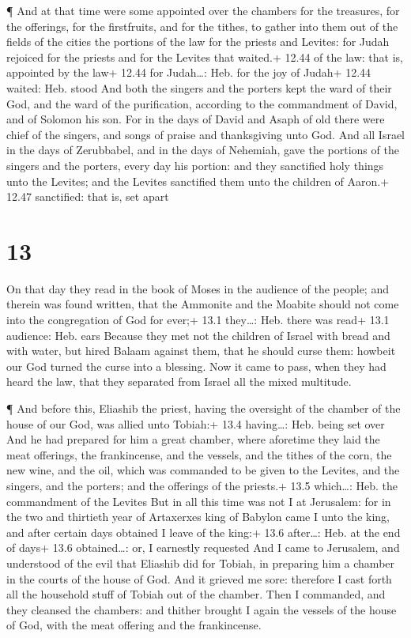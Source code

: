 ¶ And at that time were some appointed over the chambers
for the treasures, for the offerings, for the firstfruits, and for the
tithes, to gather into them out of the fields of the cities the portions
of the law for the priests and Levites: for Judah rejoiced for the
priests and for the Levites that waited.+ 12.44 of the law: that is,
appointed by the law+ 12.44 for Judah\ldots: Heb. for the joy of Judah+
12.44 waited: Heb. stood  And both the singers and the
porters kept the ward of their God, and the ward of the purification,
according to the commandment of David, and of Solomon his son.
 For in the days of David and Asaph of old there were chief
of the singers, and songs of praise and thanksgiving unto God.
 And all Israel in the days of Zerubbabel, and in the days
of Nehemiah, gave the portions of the singers and the porters, every day
his portion: and they sanctified holy things unto the Levites; and the
Levites sanctified them unto the children of Aaron.+ 12.47 sanctified:
that is, set apart

\hypertarget{section-12}{%
\section{13}\label{section-12}}

 On that day they read in the book of Moses in the audience
of the people; and therein was found written, that the Ammonite and the
Moabite should not come into the congregation of God for ever;+ 13.1
they\ldots: Heb. there was read+ 13.1 audience: Heb. ears 
Because they met not the children of Israel with bread and with water,
but hired Balaam against them, that he should curse them: howbeit our
God turned the curse into a blessing.  Now it came to pass,
when they had heard the law, that they separated from Israel all the
mixed multitude.

 ¶ And before this, Eliashib the priest, having the
oversight of the chamber of the house of our God, was allied unto
Tobiah:+ 13.4 having\ldots: Heb. being set over  And he had
prepared for him a great chamber, where aforetime they laid the meat
offerings, the frankincense, and the vessels, and the tithes of the
corn, the new wine, and the oil, which was commanded to be given to the
Levites, and the singers, and the porters; and the offerings of the
priests.+ 13.5 which\ldots: Heb. the commandment of the Levites
 But in all this time was not I at Jerusalem: for in the two
and thirtieth year of Artaxerxes king of Babylon came I unto the king,
and after certain days obtained I leave of the king:+ 13.6 after\ldots:
Heb. at the end of days+ 13.6 obtained\ldots: or, I earnestly requested
 And I came to Jerusalem, and understood of the evil that
Eliashib did for Tobiah, in preparing him a chamber in the courts of the
house of God.  And it grieved me sore: therefore I cast
forth all the household stuff of Tobiah out of the chamber. 
Then I commanded, and they cleansed the chambers: and thither brought I
again the vessels of the house of God, with the meat offering and the
frankincense.

